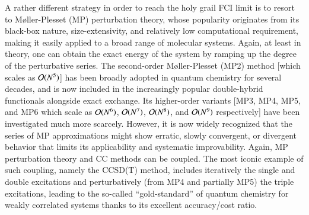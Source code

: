 \documentclass[aip,jcp,reprint,noshowkeys,superscriptaddress,floatfix]{revtex4-1}
\newcommand{\Norb}{N}
\begin{document}
A rather different strategy in order to reach the holy grail FCI limit is to resort to M{\o}ller-Plesset (MP) perturbation theory, \cite{Moller_1934} whose popularity originates from its black-box nature, size-extensivity, and relatively low computational requirement, making it easily applied to a broad range of molecular systems. 
Again, at least in theory, one can obtain the exact energy of the system by ramping up the degree of the perturbative series. \cite{Marie_2021a}
The second-order M{\o}ller-Plesset (MP2) method \cite{Moller_1934} [which scales as $\order*{\Norb^{5}}$] has been broadly adopted in quantum chemistry for several decades, and is now included in the increasingly popular double-hybrid functionals \cite{Grimme_2006} alongside exact exchange. 
Its higher-order variants [MP3, \cite{Pople_1976} MP4, \cite{Krishnan_1980} MP5, \cite{Kucharski_1989} and MP6 \cite{He_1996a,He_1996b} which scale as $\order*{\Norb^{6}}$, $\order*{\Norb^{7}}$, $\order*{\Norb^{8}}$, and $\order*{\Norb^{9}}$ respectively] have been investigated much more scarcely.
However, it is now widely recognized that the series of MP approximations might show erratic, slowly convergent, or divergent behavior that limits its applicability and systematic improvability. \cite{Laidig_1985,Knowles_1985,Handy_1985,Gill_1986,Laidig_1987,Nobes_1987,Gill_1988,Gill_1988a,Lepetit_1988,Malrieu_2003,Marie_2021a}
Again, MP perturbation theory and CC methods can be coupled.
The most iconic example of such coupling, namely the CCSD(T) method, \cite{Raghavachari_1989} includes iteratively the single and double excitations and perturbatively (from MP4 and partially MP5) the triple excitations, leading to the so-called ``gold-standard'' of quantum chemistry for weakly correlated systems thanks to its excellent accuracy/cost ratio.
\end{document}
